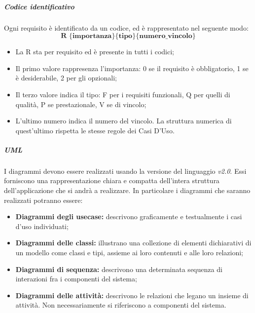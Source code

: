 			
			\subparagraph{Codice identificativo} \Spazio
			Ogni requisito è identificato da un codice, ed è rappresentato nel seguente modo:
			$$ \textbf{R \{importanza\}\{tipo\}\{numero\_vincolo\} } $$
			
			\begin{itemize}
				\item La R sta per requisito ed è presente in tutti i codici;
				\item Il primo valore rappresenza l'importanza: 0 se il requisito è obbligatorio, 1 se è desiderabile, 2 per gli opzionali;
				\item Il terzo valore indica il tipo: F per i requisiti funzionali, Q per quelli di qualità, P se prestazionale, V se di vincolo;
				\item L'ultimo numero indica il numero del vincolo. La struttura numerica di quest'ultimo rispetta le stesse regole dei Casi D'Uso.
			\end{itemize}
		
	        
		    
			\subparagraph{UML}
			\label{sec:UML} \Spazio
			I diagrammi  devono essere realizzati usando la versione del linguaggio \textit{v2.0}. Essi forniscono una rappresentazione chiara e compatta dell'intera struttura dell'applicazione che si andrà a realizzare. In particolare i diagrammi che saranno realizzati potranno essere:
			\begin{itemize}
				\item \textbf{Diagrammi degli usecase:} descrivono graficamente e testualmente i casi d'uso individuati;
				\item \textbf{Diagrammi delle classi:} illustrano una collezione di elementi dichiarativi di un modello come classi e tipi, assieme ai loro contenuti e alle loro relazioni;
				\item \textbf{Diagrammi di sequenza:} descrivono una determinata sequenza di interazioni fra i componenti del sistema;
				\item \textbf{Diagrammi delle attività:} descrivono le relazioni che legano un insieme di attività. Non necessariamente si riferiscono a componenti del sistema.
			\end{itemize}
			
			
